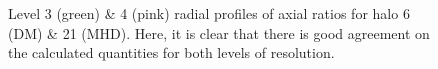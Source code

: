 \begin{figure}[!ht]
  \centering
  \hfill
  \caption{Level 3 (green) \& 4 (pink) radial profiles of axial ratios for halo 6 (DM) \& 21 (MHD). Here, it is clear that there is good agreement on the calculated quantities for both levels of resolution.}
  \label{fig:goodConvergence}
\end{figure}



